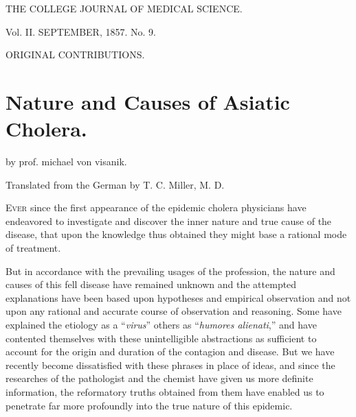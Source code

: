 THE
COLLEGE JOURNAL
OF MEDICAL SCIENCE.

Vol. II.
SEPTEMBER, 1857.
No. 9.

ORIGINAL CONTRIBUTIONS.

\chapter[Nature and Causes of Asiatic Cholera][Nature and Causes of Asiatic Cholera.]{Nature and Causes of Asiatic Cholera.}

by prof. michael von visanik.

Translated from the German by T. C. Miller, M. D.

\textsc{Ever} since the first appearance of the epidemic cholera physicians
have endeavored to investigate and discover the inner nature and true
cause of the disease, that upon the knowledge thus obtained they might
base a rational mode of treatment.

But in accordance with the prevailing usages of the profession, the
nature and causes of this fell disease have remained unknown and the
attempted explanations have been based upon hypotheses and empirical
observation and not upon any rational and accurate course of
observation and reasoning. Some have explained the etiology as
a ``\textit{virus}'' others as ``\textit{humores alienati},'' and have contented themselves
with these unintelligible abstractions as sufficient to account for
the origin and duration of the contagion and disease. But we have
recently become dissatisfied with these phrases in place of ideas, and
since the researches of the pathologist and the chemist have given us
more definite information, the reformatory truths obtained from them
have enabled us to penetrate far more profoundly into the true nature
of this epidemic.

\endinput